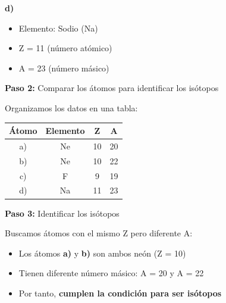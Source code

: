 \begin{exercise}
\begin{solu}
        \textbf{d) }
        \begin{itemize}
            \item Elemento: Sodio (Na)
            \item Z = 11 (número atómico)
            \item A = 23 (número másico)
        \end{itemize}

        \textbf{Paso 2:} Comparar los átomos para identificar los isótopos

        Organizamos los datos en una tabla:

        \begin{center}
            \begin{tabular}{@{}cccc@{}}
                \toprule
                \textbf{Átomo} & \textbf{Elemento} & \textbf{Z} & \textbf{A} \\
                \midrule
                a) & Ne & 10 & 20 \\[3pt]
                b) & Ne & 10 & 22 \\[3pt]
                c) & F & 9 & 19 \\[3pt]
                d) & Na & 11 & 23 \\
                \bottomrule
            \end{tabular}
        \end{center}

        \textbf{Paso 3:} Identificar los isótopos

        Buscamos átomos con el mismo Z pero diferente A:
        \begin{itemize}
            \item Los átomos \textbf{a)} y \textbf{b)} son ambos neón (Z = 10)
            \item Tienen diferente número másico: A = 20 y A = 22
            \item Por tanto, \textbf{cumplen la condición para ser isótopos}
        \end{itemize}


\end{solu}
\end{exercise}
